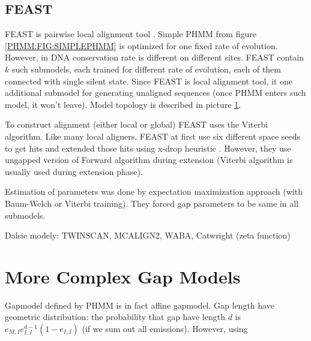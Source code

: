 \subsection{FEAST}
FEAST is pairwise local alignment tool \cite{FEAST2011}. Simple PHMM from figure
\ref{PHMM:FIG:SIMPLEPHMM} is optimized for one fixed rate of evolution. However,
in DNA conservation rate is different on different sites.  FEAST contain $k$
such submodels, each trained for different rate of evolution, each of them
connected with single silent state. Since FEAST is local alignment tool, it
one additional submodel for generating unaligned sequences (once PHMM enters
such model, it won't leave). Model topology is described in picture
\ref{}.

To construct alignment (either local or global) FEAST uses the Viterbi
algorithm. Like many local aligners, FEAST at first use six different space
seeds to get hits and extended those hits using x-drop heuristic \cite{}.
However, they use ungapped version of Forward algorithm during extension
(Viterbi algorithm is usually used during extension phase).

Estimation of parameters was done by expectation maximization approach (with
Baum-Welch or Viterbi training). They forced gap parameters to be same in all
submodels.


Dalsie modely: TWINSCAN, MCALIGN2, WABA, Catwright (zeta function)

\section{More Complex Gap Models}
Gapmodel defined by PHMM is in fact affine gapmodel.
Gap length have geometric distribution: the probability that gap have length $d$
is $e_{M,I}e_{I,I}^{d-1}(1-e_{I,I})$ (if we sum out all emissions). However,
using

